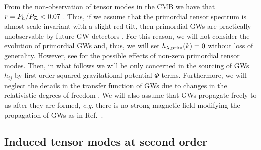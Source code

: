\documentclass[aps,10pt,prd,groupedaddress,nofootinbib,notitlepage,eqsecnum,preprintnumbers]{revtex4-1}
\begin{document}
From the non-observation of tensor modes in the CMB we have that $r=P_h/P_{\cal R}<0.07$ \cite{Akrami:2018odb}. Thus, if we assume that the primordial tensor spectrum is almost scale invariant with a slight red tilt, then primordial GWs are practically unobservable by future GW detectors \cite{Guzzetti:2016mkm}. For this reason, we will not consider the evolution of primordial GWs and, thus, we will set $h_{\lambda,{\rm prim}}(k)=0$ without loss of generality. However, see \cite{Garcia-Bellido:2017aan,Unal:2018yaa} for the possible effects of non-zero primordial tensor modes. Then, in what follows we will be only concerned in the sourcing of GWs $h_{ij}$ by first order squared gravitational potential $\Phi$ terms. Furthermore, we will neglect the details in the transfer function of GWs due to changes in the relativistic degrees of freedom \cite{Watanabe:2006qe}. We will also assume that GWs propagate freely to us after they are formed, \textit{e.g.} there is no strong magnetic field modifying the propagation of GWs as in Ref.~\cite{Bamba:2018cup}.



\subsection{Induced tensor modes at second order\label{sec:secondorder}}
\end{document}

